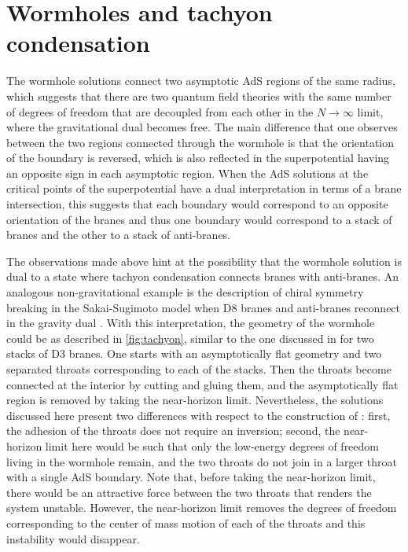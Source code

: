 \section{Wormholes and tachyon condensation}\label{sec:wormholes}

The wormhole solutions connect two asymptotic AdS regions of the same radius, which suggests that there are two quantum field theories with the same number of degrees of freedom that are decoupled from each other in the $N\to \infty$ limit, where the gravitational dual becomes free.
The main difference that one observes between the two regions connected through the wormhole is that the orientation of the boundary is reversed, which is also reflected in the superpotential having an opposite sign in each asymptotic region.
When the AdS solutions at the critical points of the superpotential have a dual interpretation in terms of a brane intersection, this suggests that each boundary would correspond to an opposite orientation of the branes and thus one boundary would correspond to a stack of branes and the other to a stack of anti-branes. 
 
The observations made above hint at the possibility that the wormhole solution is dual to a state where tachyon condensation connects branes with anti-branes.
An analogous non-gravitational example is the description of chiral symmetry breaking in the Sakai-Sugimoto model when D8 branes and anti-branes reconnect in the gravity dual \cite{Sakai:2004cn,Casero:2007ae,Dhar:2007bz}.
With this interpretation, the geometry of the wormhole could be as described in \cref{fig:tachyon}, similar to the one discussed in \cite{Balasubramanian:2020ffd} for two stacks of D3 branes.
One starts with an asymptotically flat geometry and two separated throats corresponding to each of the stacks.
Then the throats become connected at the interior by cutting and gluing them, and the asymptotically flat region is removed by taking the near-horizon limit.
Nevertheless, the solutions discussed here present two differences with respect to the construction of \cite{Balasubramanian:2020ffd}: first, the adhesion of the throats does not require an inversion; second, the near-horizon limit here would be such that only the low-energy degrees of freedom living in the wormhole remain, and the two throats do not join in a larger throat with a single AdS boundary.
Note that, before taking the near-horizon limit, there would be an attractive force between the two throats that renders the system unstable.
However, the near-horizon limit removes the degrees of freedom corresponding to the center of mass motion of each of the throats and this instability would disappear.


